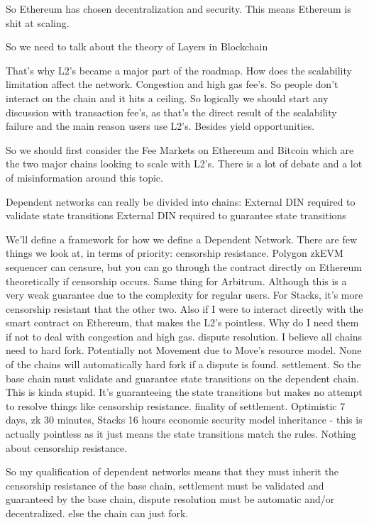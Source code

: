 \documentclass[
  letterpaper,
  DIV=11,
  numbers=noendperiod]{scrreprt}
\begin{document}
So Ethereum has chosen decentralization and security. This means
Ethereum is shit at scaling.

So we need to talk about the theory of Layers in Blockchain

That's why L2's became a major part of the roadmap. How does the
scalability limitation affect the network. Congestion and high gas
fee's. So people don't interact on the chain and it hits a ceiling. So
logically we should start any discussion with transaction fee's, as
that's the direct result of the scalability failure and the main reason
users use L2's. Besides yield opportunities.

So we should first consider the Fee Markets on Ethereum and Bitcoin
which are the two major chains looking to scale with L2's. There is a
lot of debate and a lot of misinformation around this topic.

Dependent networks can really be divided into chains: External DIN
required to validate state transitions External DIN required to
guarantee state transitions

We'll define a framework for how we define a Dependent Network. There
are few things we look at, in terms of priority: censorship resistance.
Polygon zkEVM sequencer can censure, but you can go through the contract
directly on Ethereum theoretically if censorship occurs. Same thing for
Arbitrum. Although this is a very weak guarantee due to the complexity
for regular users. For Stacks, it's more censorship resistant that the
other two. Also if I were to interact directly with the smart contract
on Ethereum, that makes the L2's pointless. Why do I need them if not to
deal with congestion and high gas. dispute resolution. I believe all
chains need to hard fork. Potentially not Movement due to Move's
resource model. None of the chains will automatically hard fork if a
dispute is found. settlement. So the base chain must validate and
guarantee state transitions on the dependent chain. This is kinda
stupid. It's guaranteeing the state transitions but makes no attempt to
resolve things like censorship resistance. finality of settlement.
Optimistic 7 days, zk 30 minutes, Stacks 16 hours economic security
model inheritance - this is actually pointless as it just means the
state transitions match the rules. Nothing about censorship resistance.

So my qualification of dependent networks means that they must inherit
the censorship resistance of the base chain, settlement must be
validated and guaranteed by the base chain, dispute resolution must be
automatic and/or decentralized. else the chain can just fork.
\end{document}
